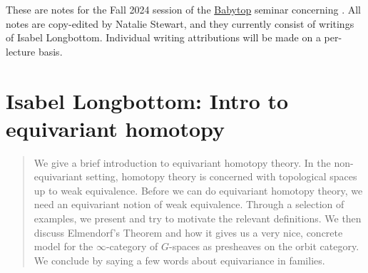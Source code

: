 \documentclass[10pt]{amsart}
\date{\today}
\begin{document}
\maketitle


These are notes for the Fall 2024 session of the \href{https://math.mit.edu/topology/babytop/index.html}{Babytop} seminar concerning \cite{HHR}.
All notes are copy-edited by Natalie Stewart, and they currently consist of writings of Isabel Longbottom. 
Individual writing attributions will be made on a per-lecture basis. 

\toc


\setlength{\parskip}{0.2em}



\newpage
\section{Isabel Longbottom: Intro to equivariant homotopy}
\begin{abstract}
    We give a brief introduction to equivariant homotopy theory. In the non-equivariant setting, homotopy theory is concerned with topological spaces up to weak equivalence. Before we can do equivariant homotopy theory, we need an equivariant notion of weak equivalence. Through a selection of examples, we present and try to motivate the relevant definitions. We then discuss Elmendorf's Theorem and how it gives us a very nice, concrete model for the $\infty$-category of $G$-spaces as presheaves on the orbit category. We conclude by saying a few words about equivariance in families.
\end{abstract}



 
\printbibliography
\end{document}
